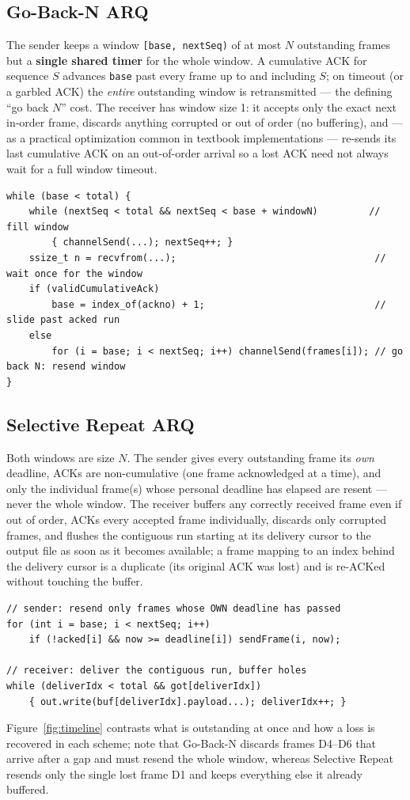 \documentclass[11pt]{article}
\begin{document}
\subsection{Go-Back-N ARQ}
The sender keeps a window \texttt{[base, nextSeq)} of at most $N$ outstanding frames but a
\textbf{single shared timer} for the whole window. A cumulative ACK for sequence $S$
advances \texttt{base} past every frame up to and including $S$; on timeout (or a garbled
ACK) the \emph{entire} outstanding window is retransmitted — the defining ``go back $N$''
cost. The receiver has window size 1: it accepts only the exact next in-order frame,
discards anything corrupted or out of order (no buffering), and — as a practical
optimization common in textbook implementations — re-sends its last cumulative ACK on an
out-of-order arrival so a lost ACK need not always wait for a full window timeout.
\begin{lstlisting}
while (base < total) {
    while (nextSeq < total && nextSeq < base + windowN)         // fill window
        { channelSend(...); nextSeq++; }
    ssize_t n = recvfrom(...);                                   // wait once for the window
    if (validCumulativeAck)
        base = index_of(ackno) + 1;                              // slide past acked run
    else
        for (i = base; i < nextSeq; i++) channelSend(frames[i]); // go back N: resend window
}
\end{lstlisting}

\subsection{Selective Repeat ARQ}
Both windows are size $N$. The sender gives every outstanding frame its \emph{own}
deadline, ACKs are non-cumulative (one frame acknowledged at a time), and only the
individual frame(s) whose personal deadline has elapsed are resent — never the whole
window. The receiver buffers any correctly received frame even if out of order, ACKs every
accepted frame individually, discards only corrupted frames, and flushes the contiguous run
starting at its delivery cursor to the output file as soon as it becomes available; a frame
mapping to an index behind the delivery cursor is a duplicate (its original ACK was lost)
and is re-ACKed without touching the buffer.
\begin{lstlisting}
// sender: resend only frames whose OWN deadline has passed
for (int i = base; i < nextSeq; i++)
    if (!acked[i] && now >= deadline[i]) sendFrame(i, now);

// receiver: deliver the contiguous run, buffer holes
while (deliverIdx < total && got[deliverIdx])
    { out.write(buf[deliverIdx].payload...); deliverIdx++; }
\end{lstlisting}
Figure~\ref{fig:timeline} contrasts what is outstanding at once and how a loss is recovered
in each scheme; note that Go-Back-N discards frames D4--D6 that arrive after a gap and must
resend the whole window, whereas Selective Repeat resends only the single lost frame D1 and
keeps everything else it already buffered.
\end{document}
